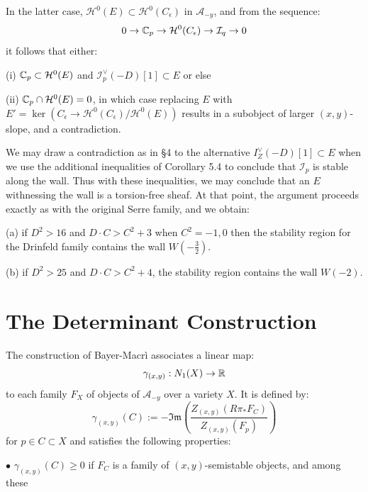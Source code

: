 \documentclass{amsart}
\begin{document}
In the latter case, ${\mathcal H}^0(E) \subset {\mathcal H}^0(C_\epsilon)$ in ${\mathcal A}_{-y}$, and from the sequence:
\[ 0 \rightarrow {\mathbb C}_p \rightarrow {\mathcal H}^0(C_\epsilon) \rightarrow {\mathcal I}_q \rightarrow 0 \] 
it follows that either:

\medskip

(i) ${\mathbb C}_p \subset {\mathcal H}^0(E)$ and ${\mathcal I}_p^\vee(-D)[1] \subset E$ or else

\medskip

(ii) ${\mathbb C}_p \cap {\mathcal H}^0(E) = 0$, in which case replacing $E$ with $E' = 
\ker(C_\epsilon \rightarrow {\mathcal H}^0(C_\epsilon)/{\mathcal H}^0(E))$
results in a subobject of larger $(x,y)$-slope, and a contradiction.  

\medskip

We may draw a contradiction as in \S 4 to the alternative $I_Z^\vee(-D)[1] \subset E$ when we use the  additional 
inequalities of Corollary 5.4 to conclude that ${\mathcal I}_p$ is stable along the wall. Thus with these inequalities,
we may conclude that an $E$ withnessing the wall is a torsion-free sheaf. At that point, the 
argument proceeds exactly as with the original Serre family, and we obtain: 

\medskip

 (a) if $D^2 > 16$ and $D \cdot C > C^2 + 3$ when $C^2 = -1,0$ then the stability region for the Drinfeld family contains the wall
$W(-\frac 32)$. 

\medskip

(b) if $D^2 > 25$ and $D \cdot C > C^2 + 4$, the stability region contains the wall $W(-2)$. 

\medskip

\section{The Determinant Construction} 

The construction of Bayer-Macr\`i \cite{BM3} associates a linear map: 
\[ \gamma_{(x,y)}: N_1(X) \rightarrow {\mathbb R}  \] 
to each family $F_X$ of objects of ${\mathcal A}_{-y}$ over a variety $X$. It is defined by: 
\[ \gamma_{(x,y)}(C) := - \mathfrak {Im} \left( \frac { Z_{(x,y)}(R\pi_* F_C)}{Z_{(x,y)}(F_p)} \right) \] 
for $p\in C \subset X$ and satisfies the following properties: 

\medskip

$\bullet$  $\gamma_{(x,y)}(C) \ge 0$ if $F_C$ is a family of $(x,y)$-semistable objects, and among these
\end{document}
